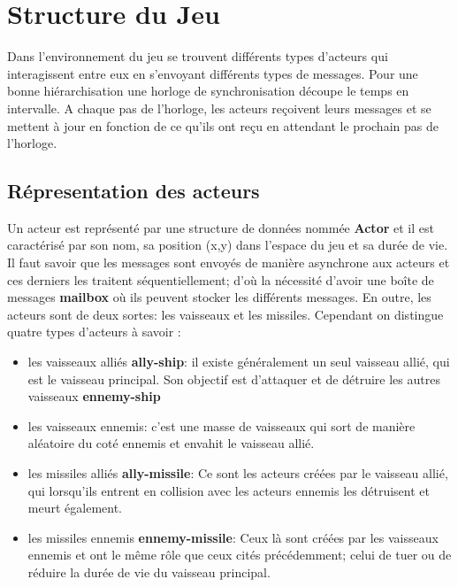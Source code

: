 \section{Structure du Jeu}

Dans l'environnement du jeu se trouvent différents types d'acteurs qui interagissent entre eux en s'envoyant différents types de messages. Pour  une bonne hiérarchisation une horloge de synchronisation découpe le temps en intervalle. A chaque pas de l'horloge, les acteurs reçoivent leurs messages et se mettent à jour en fonction de ce qu'ils ont reçu en attendant le prochain pas de l'horloge.

\subsection{Répresentation des acteurs}
Un acteur est représenté par une structure de données nommée \textbf{Actor} et il est caractérisé par son nom, sa position (x,y) dans l'espace du jeu et sa durée de vie.
Il faut savoir que les messages sont envoyés de manière asynchrone aux acteurs et ces derniers les traitent séquentiellement; d'où la nécessité d'avoir une boîte de messages \textbf{mailbox} où ils peuvent stocker les différents messages.
En outre, les acteurs sont de deux sortes: les vaisseaux et les missiles. Cependant on distingue quatre types d'acteurs à savoir : 
\\

\begin{itemize}

    \item les vaisseaux alliés \textbf{ally-ship}: il existe généralement un seul vaisseau allié, qui est le vaisseau principal. Son objectif est d'attaquer et de détruire les autres vaisseaux \textbf{ennemy-ship}
    \item les vaisseaux ennemis: c'est une masse de vaisseaux qui sort de manière aléatoire du coté ennemis et envahit le vaisseau allié. 
    \item les missiles alliés \textbf{ally-missile}: Ce sont les acteurs créées par le vaisseau allié, qui lorsqu'ils entrent en collision avec les acteurs ennemis les détruisent et meurt également.
    \item les missiles ennemis \textbf{ennemy-missile}: Ceux là sont créées par les vaisseaux ennemis et ont le même rôle que ceux cités précédemment; celui de tuer ou de réduire la durée de vie du vaisseau principal. 
    \\
\end{itemize}

